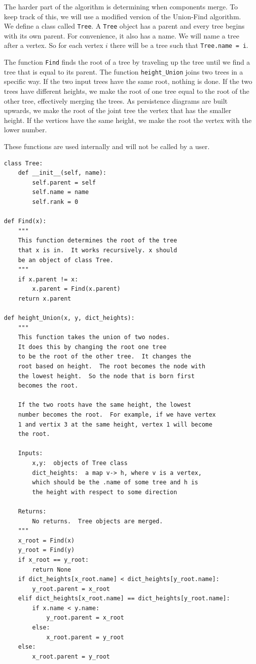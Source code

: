 \documentclass[11pt]{amsart}
\begin{document}
The harder part of the algorithm is determining when components merge.  To keep track of this, we will use a modified version of the Union-Find algorithm.  We define a class called \texttt{Tree}.  A \texttt{Tree} object has a parent and every tree begins with its own parent.  For convenience, it also has a name.  We will name a tree after a vertex.  So for each vertex $i$ there will be a tree such that \texttt{Tree.name = i}.  

The function \texttt{Find} finds the root of a tree by traveling up the tree until we find a tree that is equal to its parent.  The function \texttt{height\_Union} joins two trees in a specific way.  If the two input trees have the same root, nothing is done.  If the two trees have different heights, we make the root of one tree equal to the root of the other tree, effectively merging the trees.  As persistence diagrams are built upwards, we make the root of the joint tree the vertex that has the smaller height.  If the vertices have the same height, we make the root the vertex with the lower number.  

These functions are used internally and will not be called by a user.  

\begin{verbatim}
class Tree:
	def __init__(self, name):
		self.parent = self
		self.name = name
		self.rank = 0
	
def Find(x):
	"""
	This function determines the root of the tree
	that x is in.  It works recursively. x should
	be an object of class Tree.
	"""
	if x.parent != x:
		x.parent = Find(x.parent)	
	return x.parent

def height_Union(x, y, dict_heights):
	"""
	This function takes the union of two nodes.
	It does this by changing the root one tree
	to be the root of the other tree.  It changes the
	root based on height.  The root becomes the node with
	the lowest height.  So the node that is born first
	becomes the root.  

	If the two roots have the same height, the lowest 
	number becomes the root.  For example, if we have vertex
	1 and vertix 3 at the same height, vertex 1 will become
	the root.  

	Inputs:
		x,y:  objects of Tree class
		dict_heights:  a map v-> h, where v is a vertex,
		which should be the .name of some tree and h is
		the height with respect to some direction
        
    Returns:
        No returns.  Tree objects are merged.
	"""
	x_root = Find(x)
	y_root = Find(y)
	if x_root == y_root:
		return None
	if dict_heights[x_root.name] < dict_heights[y_root.name]:
		y_root.parent = x_root
	elif dict_heights[x_root.name] == dict_heights[y_root.name]:
		if x.name < y.name:
			y_root.parent = x_root
		else:
			x_root.parent = y_root
	else:
		x_root.parent = y_root
		
\end{verbatim}
\end{document}
